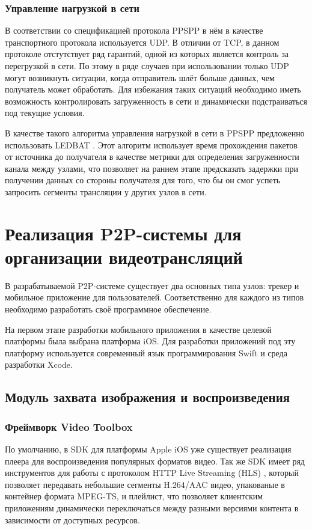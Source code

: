 		\subsubsection{Управление нагрузкой в сети}
		В соответствии со спецификацией протокола PPSPP в нём в качестве транспортного протокола используется UDP.
		В отличии от TCP, в данном протоколе отстутствует ряд гарантий, одной из которых является контроль за
		перегрузкой в сети. По этому в ряде случаев при использовании только UDP могут возникнуть ситуации, когда
		отправитель шлёт больше данных, чем получатель может обработать. Для избежания таких ситуаций
		необходимо иметь возможность контролировать загруженность в сети и динамически подстраиваться под текущие
		условия.

		В качестве такого алгоритма управления нагрузкой в сети в PPSPP предложенно использовать LEDBAT \cite{rfc6817}. Этот алгоритм
		использует время прохождения пакетов от источника до получателя в качестве метрики для определения загруженности
		канала между узлами, что позволяет на раннем этапе предсказать задержки при получении данных со стороны
		получателя для того, что бы он смог успеть запросить сегменты трансляции у других узлов в сети.

\section{Реализация P2P-системы для организации видеотрансляций}
	В разрабатываемой P2P-системе существует два основных типа узлов: трекер и мобильное приложение для пользователей.
	Соответственно для каждого из типов необходимо разработать своё программное обеспечение.

	На первом этапе разработки мобильного приложения в качестве целевой платформы была выбрана платформа iOS.
	Для разработки приложений под эту платформу используется современный язык программирования Swift и среда разработки
	Xcode.

		\subsection{Модуль захвата изображения и воспроизведения}

			\subsubsection{Фреймворк Video Toolbox}
			По умолчанию, в SDK для платформы Apple iOS уже существует реализация плеера для воспроизведения популярных
			форматов видео. Так же SDK имеет ряд инструментов для работы с протоколом HTTP Live Streaming (HLS) \cite{8945984}, который
			позволяет передавать небольшие сегменты H.264/AAC видео, упакованые в контейнер формата MPEG-TS, и плейлист,
			что позволяет клиентским приложениям динамически переключаться между разными версиями контента в зависимости
			от доступных ресурсов.

